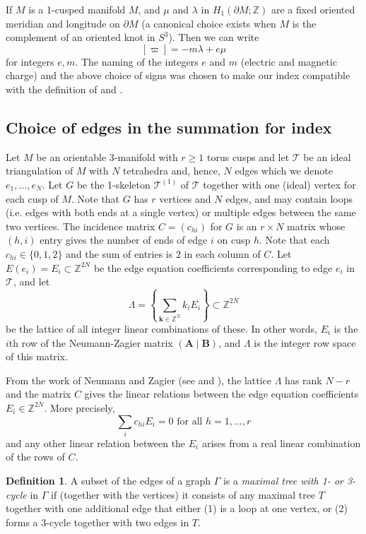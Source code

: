 \documentclass[12pt]{amsart}
\theoremstyle{definition}
\newtheorem{defn}[thm]{Definition}
\theoremstyle{remark}
\def\Z{\mathbb{Z}}
\def\kk{\boldsymbol{k}}
\def\pt{\partial}
\def\lbl{\label}
\newcommand{\CT}{\mathcal{T}}
\def\be{  \begin{equation} }
\def\ee{  \end{equation} }
\newcommand{\mb}{\mathbf}
\begin{document}
If $M$ is a 1-cusped manifold $M$, and
$\mu$ and $\lambda$ in $H_1(\pt M;\Z)$ are a fixed oriented meridian and longitude on $\pt M$
(a canonical choice exists when $M$ is the complement of an oriented knot in $S^3$).
Then we can write 
\begin{equation}
\lbl{eq.varpiem}
[\varpi]=-m \lambda + e \mu
\end{equation} 
for integers $e,m$. 
The naming of  the integers $e$ and $m$ (electric and magnetic charge) 
and the above choice of signs was chosen to make our index compatible with
the definition of \cite{DGG2} and \cite{Ga:index}. 


\subsection{Choice of edges in the summation for index}

Let $M$ be an 
orientable 3-manifold with $r \ge 1$ torus cusps and let $\CT$
be an ideal triangulation of $M$ with $N$ tetrahedra and, hence,  $N$ edges which we denote $e_1, \ldots, e_N$.
Let $G$ be 
the 1-skeleton $\CT^{(1)}$ of $\CT$ together with one (ideal) vertex for each cusp of $M$.
Note that $G$ has $r$ vertices and $N$ edges, 
and may contain loops (i.e. edges with both ends at a single vertex)  
or multiple edges between the same two vertices.
The incidence matrix $C = (c_{hi})$ for $G$  is an $r \times N$ matrix whose 
$(h,i)$ entry gives the number of ends of edge $i$ on cusp $h$. Note that
each $c_{hi} \in \{0,1,2\}$ and the sum of entries is $2$ in each column of $C$.
Let $E(e_i)=E_i  \subset  \Z^{2N}$
be the edge equation coefficients
corresponding to edge $e_i$ in $\CT$, and let
\be
\Lambda = \left\{ \sum_{\kk \in \Z^N} k_i E_i \right\} \subset  \Z^{2N}
\ee
be the lattice of all integer linear combinations of these. In other words,
$E_i$ is the $i$th row of the Neumann-Zagier matrix $(\mb A \mid \mb B)$, and
$\Lambda$ is the integer row space of this matrix.

From the work of Neumann and Zagier (see \cite{NZ} and \cite[Thm 4.1]{Neumann-combi}), 
the lattice $\Lambda$
has rank $N-r$ and the  matrix $C$ gives the linear relations between the 
edge equation coefficients $E_i \in  \Z^{2N}$. More precisely,
\be
\label{cusp_relations}
\sum_i c_{hi} E_i =0 \text{ for all } h=1, \ldots, r
\ee
and any other linear relation between the $E_i$ arises from
a real linear combination of the rows of $C$.

\begin{defn}\label{maximal tree with cycle}
A subset of the edges of a graph $\Gamma$ is a \emph{maximal tree with 1- or 3-cycle} in $\Gamma$ if (together with the vertices) it consists of any maximal tree $T$  
together with one additional edge that either (1) is a loop at one vertex, 
or (2) forms a 3-cycle together with two edges in $T$.
\end{defn}
\end{document}
